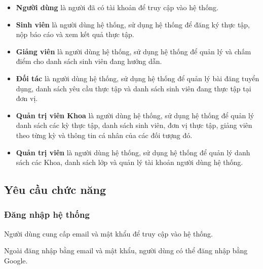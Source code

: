 \documentclass[./../main.tex]{subfiles}
\begin{document}
\begin{itemize}
	\item

	      \textbf{Người dùng} là người đã có tài khoản để truy cập vào hệ thống.

	\item

	      \textbf{Sinh viên} là người dùng hệ thống, sử dụng hệ thống để đăng ký
	      thực tập, nộp báo cáo và xem kết quả thực tập.

	\item

	      \textbf{Giảng viên} là người dùng hệ thống, sử dụng hệ thống để quản
	      lý và chấm điểm cho danh sách sinh viên đang hướng dẫn.

	\item

	      \textbf{Đối tác} là người dùng hệ thống, sử dụng hệ thống để quản lý
	      bài đăng tuyển dụng, danh sách yêu cầu thực tập và danh sách sinh viên
	      đang thực tập tại đơn vị.

	\item

	      \textbf{Quản trị viên Khoa} là người dùng hệ thống, sử dụng hệ thống
	      để quản lý danh sách các kỳ thực tập, danh sách sinh viên, đơn vị thực
	      tập, giảng viên theo từng kỳ và thông tin cá nhân của các đối tượng
	      đó.

	\item

	      \textbf{Quản trị viên} là người dùng hệ thống, sử dụng hệ thống để
	      quản lý danh sách các Khoa, danh sách lớp và quản lý tài khoản người
	      dùng hệ thống.

\end{itemize}

\subsection{Yêu cầu chức năng}

\hypertarget{ux111ux103ng-nhux1eadp-hux1ec7-thux1ed1ng}{%
	\subsubsection{Đăng nhập hệ
		thống}\label{ux111ux103ng-nhux1eadp-hux1ec7-thux1ed1ng}}

Người dùng cung cấp email và mật khẩu để truy cập vào hệ thống.

Ngoài đăng nhập bằng email và mật khẩu, người dùng có thể đăng nhập bằng Google.
\end{document}

